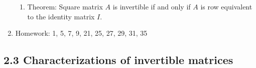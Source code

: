 \documentclass{article}
\begin{document}
\begin{enumerate}
\begin{enumerate}
\item Theorem: Square matrix $A$ is invertible if and only if $A$ is row equivalent to the identity matrix $I$. 

\end{enumerate}

\item Homework: 1, 5, 7, 9, 21, 25, 27, 29, 31, 35

\end{enumerate}

\subsection{2.3 Characterizations of invertible matrices}
\end{document}

